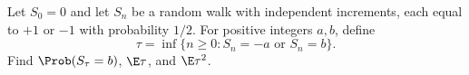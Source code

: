 Let $S_0=0$ and let $S_n$ be a random walk with independent increments, each equal to $+1$ or $-1$ with probability $1/2$. For positive integers $a,b$, define
\[
 \tau=\inf\{n\ge0:S_n=-a\text{ or }S_n=b\}.
\]
Find $\Prob(S_\tau=b)$, $\E\tau$, and $\E\tau^2$.
